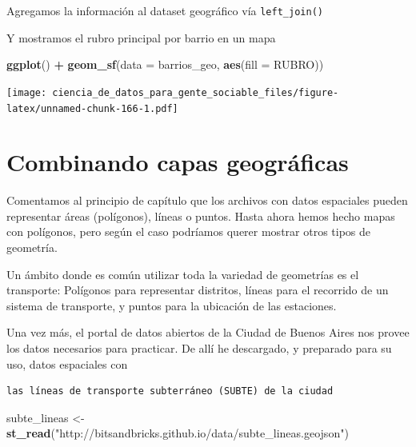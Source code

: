 \documentclass[]{book}
\newenvironment{Shaded}{\begin{snugshade}}{\end{snugshade}}
\newcommand{\KeywordTok}[1]{\textcolor[rgb]{0.13,0.29,0.53}{\textbf{#1}}}
\newcommand{\DataTypeTok}[1]{\textcolor[rgb]{0.13,0.29,0.53}{#1}}
\newcommand{\StringTok}[1]{\textcolor[rgb]{0.31,0.60,0.02}{#1}}
\newcommand{\OperatorTok}[1]{\textcolor[rgb]{0.81,0.36,0.00}{\textbf{#1}}}
\newcommand{\NormalTok}[1]{#1}
\begin{document}
Agregamos la información al dataset geográfico vía \texttt{left\_join()}

\begin{Shaded}
\end{Shaded}

Y mostramos el rubro principal por barrio en un mapa

\begin{Shaded}
\begin{Highlighting}[]
\KeywordTok{ggplot}\NormalTok{() }\OperatorTok{+}\StringTok{ }
\StringTok{    }\KeywordTok{geom_sf}\NormalTok{(}\DataTypeTok{data =}\NormalTok{ barrios_geo, }\KeywordTok{aes}\NormalTok{(}\DataTypeTok{fill =}\NormalTok{ RUBRO)) }
\end{Highlighting}
\end{Shaded}

\texttt{[image: ciencia\_de\_datos\_para\_gente\_sociable\_files/figure-latex/unnamed-chunk-166-1.pdf]}

\section{Combinando capas
geográficas}\label{combinando-capas-geograficas}

Comentamos al principio de capítulo que los archivos con datos
espaciales pueden representar áreas (polígonos), líneas o puntos. Hasta
ahora hemos hecho mapas con polígonos, pero según el caso podríamos
querer mostrar otros tipos de geometría.

Un ámbito donde es común utilizar toda la variedad de geometrías es el
transporte: Polígonos para representar distritos, líneas para el
recorrido de un sistema de transporte, y puntos para la ubicación de las
estaciones.

Una vez más, el portal de datos abiertos de la Ciudad de Buenos Aires
nos provee los datos necesarios para practicar. De allí he descargado, y
preparado para su uso, datos espaciales con

\begin{verbatim}
las líneas de transporte subterráneo (SUBTE) de la ciudad
\end{verbatim}

\begin{Shaded}
\begin{Highlighting}[]
\NormalTok{subte_lineas <-}\StringTok{ }\KeywordTok{st_read}\NormalTok{(}\StringTok{"http://bitsandbricks.github.io/data/subte_lineas.geojson"}\NormalTok{)}
\end{Highlighting}
\end{Shaded}
\end{document}
